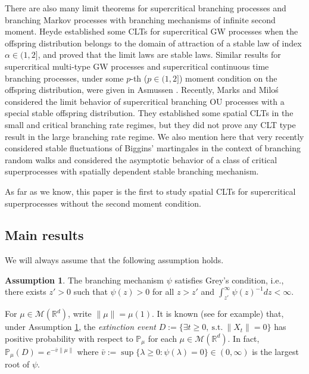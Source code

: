 \documentclass[12pt,a4paper]{amsart}
\theoremstyle{plain}
\theoremstyle{definition}
\newtheorem{asp}{Assumption}
\numberwithin{equation}{section}
\begin{document}
There are also many limit theorems for supercritical branching processes and branching Markov processes with branching mechanisms of infinite second moment.
Heyde \cite{Heyde1971Some} established some  CLTs for supercritical GW processes when the offspring distribution belongs to the domain of attraction of a stable law of index $\alpha\in (1, 2]$, and proved that the limit laws are stable laws.
Similar results  for supercritical multi-type GW processes and supercritical continuous time branching processes,
under some $p$-th ($p\in(1,2]$) moment condition on the offspring distribution, were given in Asmussen \cite{Asmussen76Convergence}.
 Recently, Marks and Milo\'s \cite{MarksMilos2018CLT} considered the limit behavior of supercritical branching OU processes with a special stable offspring distribution.
They established some spatial CLTs in the small and critical branching rate regimes, but they did not prove any CLT type result in the large branching rate regime.
We also mention here that very recently \cite{IksanovKoleskoMeiners2018Stable-like} considered stable fluctuations of Biggins' martingales in the context of branching random walks and \cite{RenSongSun2018Limit} considered the asymptotic behavior
of a class of critical superprocesses with spatially dependent stable branching mechanism.


As far as we know, this paper is the first to study spatial CLTs for supercritical superprocesses without the second moment condition.

\subsection{Main results}
\label{sec:I:R}
We will always assume that the following assumption holds.
\begin{asp}
  \label{asp: Greys condition}
  The branching mechanism $\psi$ satisfies Grey's condition, i.e., there exists $z' > 0$ such that $\psi(z) > 0$ for all $z>z'$ and  $\int_{z'}^\infty \psi(z)^{-1}dz < \infty$.
\end{asp}
For $\mu \in \mathcal M(\mathbb R^d)$, write $\|\mu\| = \mu(1)$.
It is known (see \cite[Theorems 12.5 \& 12.7]{Kyprianou2014Fluctuations} for example) that, under Assumption \ref{asp: Greys condition}, the \emph{extinction event} $D :=\{\exists t\geq 0,~\text{s.t.}~ \|X_t\| =0 \}$ has positive probability with respect to $\mathbb P_\mu$ for each  $\mu \in \mathcal M(\mathbb R^d)$.
In fact, $ \mathbb{P}_{\mu} (D) = e^{-\bar v \|\mu\|}$ where $ \bar v := \sup\{\lambda \geq 0: \psi(\lambda) = 0\} \in (0,\infty) $ is the largest root of $\psi$.
\end{document}
